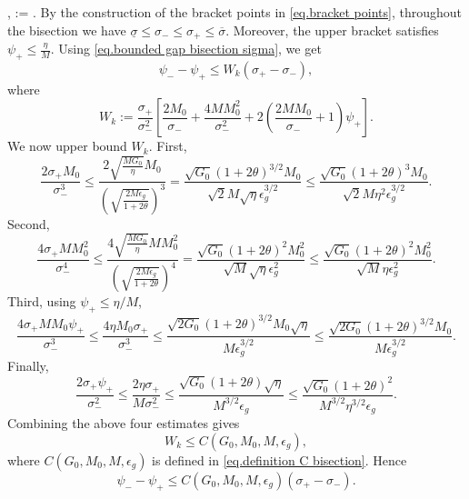 \documentclass[moor,sglanonrev]{informs4}
\begin{document}
\begin{APPENDICES}
    ,
    \overline{\sigma}
    :=
    .
    \)
    By the construction of the bracket points in \eqref{eq.bracket points},
    throughout the bisection we have
    \(
    \underline{\sigma}
    \le
    \sigma_-
    \le
    \sigma_+
    \le
    \overline{\sigma}.
    \)
    Moreover, the upper bracket satisfies
    \(
    \psi_+\le \frac{\eta}{M}.
    \)
    Using \eqref{eq.bounded gap bisection sigma}, we get
    \[
        \psi_- - \psi_+
        \le
        W_k(\sigma_+-\sigma_-),
    \]
    where
    \[
        W_k
        :=
        \frac{\sigma_+}{\sigma_-^2}
        \left[
            \frac{2M_0}{\sigma_-}
            +
            \frac{4MM_0^2}{\sigma_-^2}
            +
            2\left(
            \frac{2MM_0}{\sigma_-}+1
            \right)\psi_+
            \right].
    \]
    We now upper bound \(W_k\). First,
    \[
        \frac{2\sigma_+M_0}{\sigma_-^3}
        \le
        \frac{
            2\sqrt{\frac{MG_0}{\eta}}M_0
        }{
            \left(
            \sqrt{\frac{2M\epsilon_g}{1+2\theta}}
            \right)^3
        }  =
        \frac{
            \sqrt{G_0}(1+2\theta)^{3/2}M_0
        }{
            \sqrt{2}M\sqrt{\eta}\epsilon_g^{3/2}
        } \le
        \frac{
            \sqrt{G_0}(1+2\theta)^3M_0
        }{
            \sqrt{2}M\eta^2\epsilon_g^{3/2}
        }.
    \]
    Second,
    \[
        \frac{4\sigma_+MM_0^2}{\sigma_-^4}
        \le
        \frac{
            4\sqrt{\frac{MG_0}{\eta}}MM_0^2
        }{
            \left(
            \sqrt{\frac{2M\epsilon_g}{1+2\theta}}
            \right)^4
        } =
        \frac{
            \sqrt{G_0}(1+2\theta)^2M_0^2
        }{
            \sqrt{M}\sqrt{\eta}\epsilon_g^2
        } \le
        \frac{
            \sqrt{G_0}(1+2\theta)^2M_0^2
        }{
            \sqrt{M}\eta\epsilon_g^2
        }.
    \]
    Third, using \(\psi_+\le \eta/M\),
    \[
        \frac{4\sigma_+MM_0\psi_+}{\sigma_-^3}
        \le
        \frac{4\eta M_0\sigma_+}{\sigma_-^3} \le
        \frac{
            \sqrt{2G_0}(1+2\theta)^{3/2}M_0\sqrt{\eta}
        }{
            M\epsilon_g^{3/2}
        } \le
        \frac{
            \sqrt{2G_0}(1+2\theta)^{3/2}M_0
        }{
            M\epsilon_g^{3/2}
        }.
    \]
    Finally,
    \[
        \frac{2\sigma_+\psi_+}{\sigma_-^2}
        \le
        \frac{2\eta\sigma_+}{M\sigma_-^2} \le
        \frac{
            \sqrt{G_0}(1+2\theta)\sqrt{\eta}
        }{
            M^{3/2}\epsilon_g
        } \le
        \frac{
            \sqrt{G_0}(1+2\theta)^2
        }{
            M^{3/2}\eta^{3/2}\epsilon_g
        }.
    \]
    Combining the above four estimates gives
    \[
        W_k
        \le
        C(G_0,M_0,M,\epsilon_g),
    \]
    where \(C(G_0,M_0,M,\epsilon_g)\) is defined in
    \eqref{eq.definition C bisection}. Hence
    \[
        \psi_- - \psi_+
        \le
        C(G_0,M_0,M,\epsilon_g)(\sigma_+-\sigma_-).
    \]


\end{APPENDICES}
\end{document}
